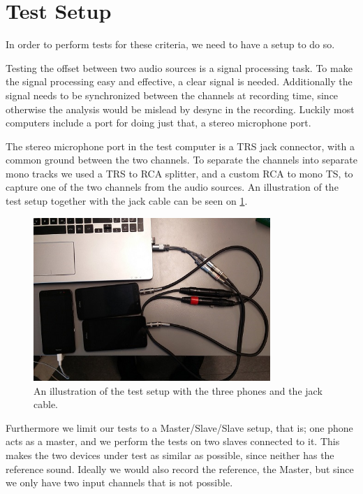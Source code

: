 \section{Test Setup}\label{sec:test_setup}
In order to perform tests for these criteria, we need to have a setup to do so.

Testing the offset between two audio sources is a signal processing
task. To make the signal processing easy and effective, a clear signal is
needed. Additionally the signal needs to be synchronized between the
channels at recording time, since otherwise the analysis would be
mislead by desync in the recording. Luckily most computers include
a port for doing just that, a stereo microphone port.

The stereo microphone port in the test computer is a \ac{TRS} jack
connector, with a common ground between the two channels. To separate
the channels into separate mono tracks we used a \ac{TRS} to \ac{RCA}
splitter, and a custom \ac{RCA} to mono \ac{TS}, to capture one of the two
channels from the audio sources.
An illustration of the test setup together with the jack cable can be seen on \cref{fig:test_setup}.

\begin{figure}[!bht]
    \centering
    \includegraphics[width=0.8\textwidth]{img/test_setup.png}
    \caption{An illustration of the test setup with the three phones and the jack cable.}
    \label{fig:test_setup}
\end{figure}

Furthermore we limit our tests to a Master/Slave/Slave setup, that is;
one phone acts as a master, and we perform the tests on two slaves
connected to it. This makes the two devices under test as similar as
possible, since neither has the reference sound.
Ideally we would also record the reference, the Master, but since we only have two input channels that is not possible.

